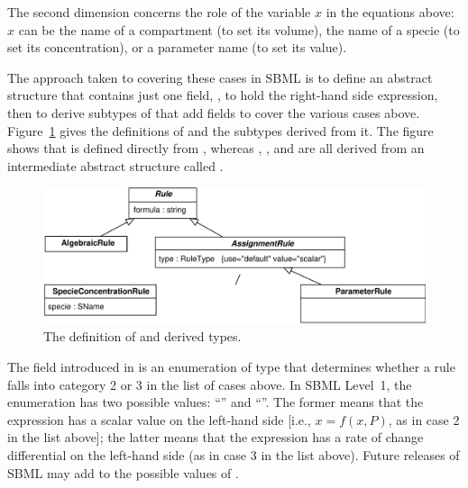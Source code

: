 \documentclass[10pt]{cekarticle}
\newcommand{\vref}[1]{\ref{#1}}
\begin{document}
The second dimension concerns the role of the variable $x$ in the equations
above: $x$ can be the name of a compartment (to set its volume), the name
of a specie (to set its concentration), or a parameter name (to set its
value).

The approach taken to covering these cases in SBML is to define an abstract
 structure that contains just one field, , to
hold the right-hand side expression, then to derive subtypes of
 that add fields to cover the various cases above.
Figure~\vref{fig:rules} gives the definitions of  and the
subtypes derived from it.  The figure shows that  is
defined directly from , whereas ,
, and  are all derived
from an intermediate abstract structure called .

\begin{figure}[htb]
  \centering
  \includegraphics[scale = 0.68]{rule}
  \caption{The definition of  and derived types.}
  \label{fig:rules}
\end{figure}

The  field introduced in  is an
enumeration of type  that determines whether a rule
falls into category 2 or 3 in the list of cases above.  In SBML Level~1,
the enumeration has two possible values: ``'' and
``''.  The former means that the expression has a scalar value
on the left-hand side [i.e., $x = f(x, P)$, as in case 2 in the list
above]; the latter means that the expression has a rate of change
differential on the left-hand side (as in case 3 in the list above).
Future releases of SBML may add to the possible values of
.


\subsubsection{}
\end{document}

